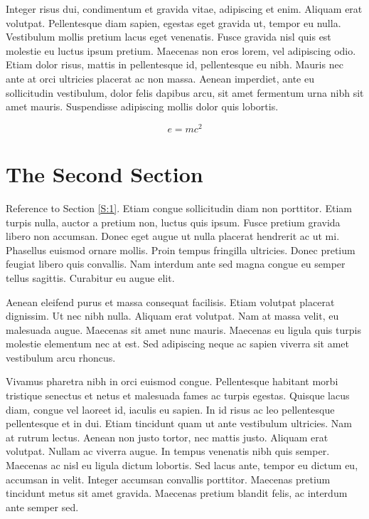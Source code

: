 \documentclass[preprint,12pt]{elsarticle}
\begin{document}
Integer risus dui, condimentum et gravida vitae, adipiscing et enim. Aliquam erat volutpat. Pellentesque diam sapien, egestas eget gravida ut, tempor eu nulla. Vestibulum mollis pretium lacus eget venenatis. Fusce gravida nisl quis est molestie eu luctus ipsum pretium. Maecenas non eros lorem, vel adipiscing odio. Etiam dolor risus, mattis in pellentesque id, pellentesque eu nibh. Mauris nec ante at orci ultricies placerat ac non massa. Aenean imperdiet, ante eu sollicitudin vestibulum, dolor felis dapibus arcu, sit amet fermentum urna nibh sit amet mauris. Suspendisse adipiscing mollis dolor quis lobortis.

\begin{equation}
\label{eq:emc}
e = mc^2
\end{equation}

\section{The Second Section}
\label{S:2}

Reference to Section \ref{S:1}. Etiam congue sollicitudin diam non porttitor. Etiam turpis nulla, auctor a pretium non, luctus quis ipsum. Fusce pretium gravida libero non accumsan. Donec eget augue ut nulla placerat hendrerit ac ut mi. Phasellus euismod ornare mollis. Proin tempus fringilla ultricies. Donec pretium feugiat libero quis convallis. Nam interdum ante sed magna congue eu semper tellus sagittis. Curabitur eu augue elit.

Aenean eleifend purus et massa consequat facilisis. Etiam volutpat placerat dignissim. Ut nec nibh nulla. Aliquam erat volutpat. Nam at massa velit, eu malesuada augue. Maecenas sit amet nunc mauris. Maecenas eu ligula quis turpis molestie elementum nec at est. Sed adipiscing neque ac sapien viverra sit amet vestibulum arcu rhoncus.

Vivamus pharetra nibh in orci euismod congue. Pellentesque habitant morbi tristique senectus et netus et malesuada fames ac turpis egestas. Quisque lacus diam, congue vel laoreet id, iaculis eu sapien. In id risus ac leo pellentesque pellentesque et in dui. Etiam tincidunt quam ut ante vestibulum ultricies. Nam at rutrum lectus. Aenean non justo tortor, nec mattis justo. Aliquam erat volutpat. Nullam ac viverra augue. In tempus venenatis nibh quis semper. Maecenas ac nisl eu ligula dictum lobortis. Sed lacus ante, tempor eu dictum eu, accumsan in velit. Integer accumsan convallis porttitor. Maecenas pretium tincidunt metus sit amet gravida. Maecenas pretium blandit felis, ac interdum ante semper sed.
\end{document}
